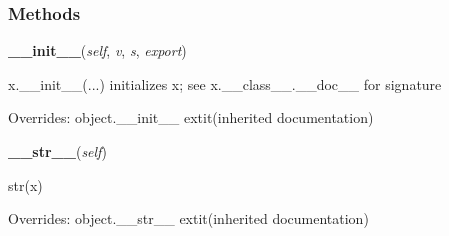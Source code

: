 
  \subsubsection{Methods}

    \vspace{0.5ex}

\hspace{.8\funcindent}\begin{boxedminipage}{\funcwidth}

    \raggedright \textbf{\_\_init\_\_}(\textit{self}, \textit{v}, \textit{s}, \textit{export})

\setlength{\parskip}{2ex}
    x.\_\_init\_\_(...) initializes x; see x.\_\_class\_\_.\_\_doc\_\_ for 
    signature

\setlength{\parskip}{1ex}
      Overrides: object.\_\_init\_\_ 	extit{(inherited documentation)}

    \end{boxedminipage}

    \vspace{0.5ex}

\hspace{.8\funcindent}\begin{boxedminipage}{\funcwidth}

    \raggedright \textbf{\_\_str\_\_}(\textit{self})

\setlength{\parskip}{2ex}
    str(x)

\setlength{\parskip}{1ex}
      Overrides: object.\_\_str\_\_ 	extit{(inherited documentation)}

    \end{boxedminipage}

    \label{keyczar:keydata:KeyVersion:Read}

    \vspace{0.5ex}

